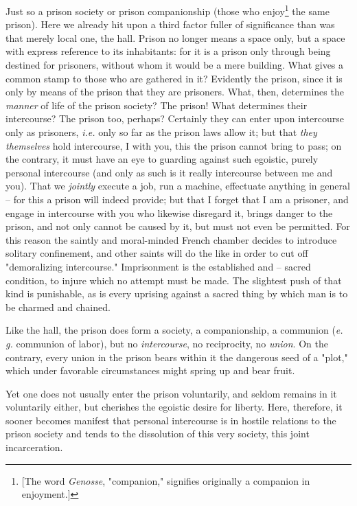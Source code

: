 \documentclass[a4paper]{book}
\begin{document}
Just so a prison society or prison companionship (those who 
enjoy\footnote{[The word \textit{Genosse}, "{}companion,"{} signifies 
originally a companion in enjoyment.]} the same prison). Here we already hit 
upon a third factor fuller of significance than was that merely local one, the 
hall. Prison no longer means a space only, but a space with express reference 
to its inhabitants: for it is a prison only through being destined for 
prisoners, without whom it would be a mere building. What gives a common stamp 
to those who are gathered in it? Evidently the prison, since it is only by 
means of the prison that they are prisoners. What, then, determines the 
\textit{manner} of life of the prison society? The prison! What determines 
their intercourse? The prison too, perhaps? Certainly they can enter upon 
intercourse only as prisoners, \textit{i.e.} only so far as the prison laws 
allow it; but that \textit{they themselves} hold intercourse, I with you, this 
the prison cannot bring to pass; on the contrary, it must have an eye to 
guarding against such egoistic, purely personal intercourse (and only as such 
is it really intercourse between me and you). That we \textit{jointly} execute 
a job, run a machine, effectuate anything in general -- for this a prison will 
indeed provide; but that I forget that I am a prisoner, and engage in 
intercourse with you who likewise disregard it, brings danger to the prison, 
and not only cannot be caused by it, but must not even be permitted. For this 
reason the saintly and moral-minded French chamber decides to introduce 
solitary confinement, and other saints will do the like in order to cut off 
"{}demoralizing intercourse."{} Imprisonment is the established and -- sacred 
condition, to injure which no attempt must be made. The slightest push of that 
kind is punishable, as is every uprising against a sacred thing by which man 
is to be charmed and chained.

Like the hall, the prison does form a society, a companionship, a communion 
(\textit{e. g.} communion of labor), but no \textit{intercourse}, no 
reciprocity, no \textit{union}. On the contrary, every union in the prison 
bears within it the dangerous seed of a "{}plot,"{} which under favorable 
circumstances might spring up and bear fruit.

Yet one does not usually enter the prison voluntarily, and seldom remains in 
it voluntarily either, but cherishes the egoistic desire for liberty. Here, 
therefore, it sooner becomes manifest that personal intercourse is in hostile 
relations to the prison society and tends to the dissolution of this very 
society, this joint incarceration.
\end{document}
